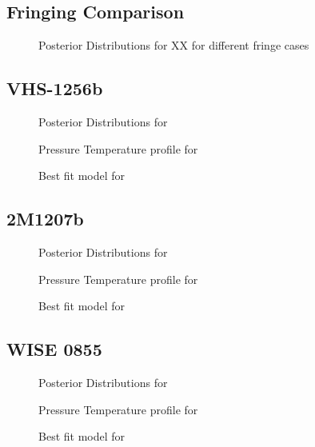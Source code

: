 \subsection{Fringing Comparison}
\begin{figure}[h]
	\caption{Posterior Distributions for XX for different fringe cases}
	\label{fig:postfringe}
\end{figure}
\subsection{VHS-1256b}
\begin{figure}[h]
	\caption{Posterior Distributions for}
	\label{fig:postVHS}
\end{figure}
\begin{figure}[h]
	\caption{Pressure Temperature profile for}
	\label{fig:presVHS}
\end{figure}
\begin{figure}[h]
	\caption{Best fit model for}
	\label{fig:bestfitVHS}
\end{figure}

\subsection{2M1207b}
\begin{figure}[h]
	\caption{Posterior Distributions for}
	\label{fig:post2M}
\end{figure}
\begin{figure}[h]
	\caption{Pressure Temperature profile for}
	\label{fig:pres2M}
\end{figure}
\begin{figure}[h]
	\caption{Best fit model for}
	\label{fig:bestfit2M}
\end{figure}

\subsection{WISE 0855}
\begin{figure}[h]
	\caption{Posterior Distributions for}
	\label{fig:postWISE}
\end{figure}
\begin{figure}[h]
	\caption{Pressure Temperature profile for}
	\label{fig:presWISE}
\end{figure}
\begin{figure}[h]
	\caption{Best fit model for}
	\label{fig:bestfitWISE}
\end{figure}
